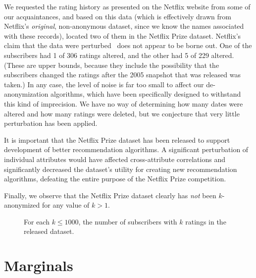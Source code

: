 \documentclass[11pt]{article}
\begin{document}
\begin{appendix}
We requested the rating history as presented on the Netflix website from
some of our acquaintances, and based on this data (which is effectively
drawn from Netflix's \emph{original}, non-anonymous dataset, since we
know the names associated with these records), located two of them
in the Netflix Prize dataset.  Netflix's claim that the data were
perturbed~\cite{faq} does not appear to be borne out.  One of the
subscribers had 1 of 306 ratings altered, and the other had 5 of 229
altered. (These are upper bounds, because they include the possibility
that the subscribers changed the ratings after the 2005 snapshot
that was released was taken.)  In any case, the level of noise is far
too small to affect our de-anonymization algorithms, which have been
specifically designed to withstand this kind of imprecision.  We have no
way of determining how many dates were altered and how many ratings were
deleted, but we conjecture that very little perturbation has been applied.

It is important that the Netflix Prize dataset has been released to
support development of better recommendation algorithms.  A significant
perturbation of individual attributes would have affected cross-attribute
correlations and significantly decreased the dataset's utility for
creating new recommendation algorithms, defeating the entire purpose of
the Netflix Prize competition.

Finally, we observe that the Netflix Prize dataset clearly has \emph{not}
been $k$-anonymized for any value of $k>1$.

\begin{figure}[h]
\begin{minipage}[b]{0.47\linewidth}
\centering
\mbox{}
\caption{For each $k \leq 100$, the number of subscribers with $k$ ratings in
the released dataset.
\label{fig:stats100}}

\end{minipage}
\begin{minipage}[b]{0.47\linewidth}
\centering
\mbox{}
\caption{For each $k \leq 1000$, the number of subscribers with $k$ ratings in
the released dataset.
\label{fig:stats1000}}
\end{minipage}
\end{figure}


\section{Marginals}
\label{marginals}


\end{appendix}
\end{document}
